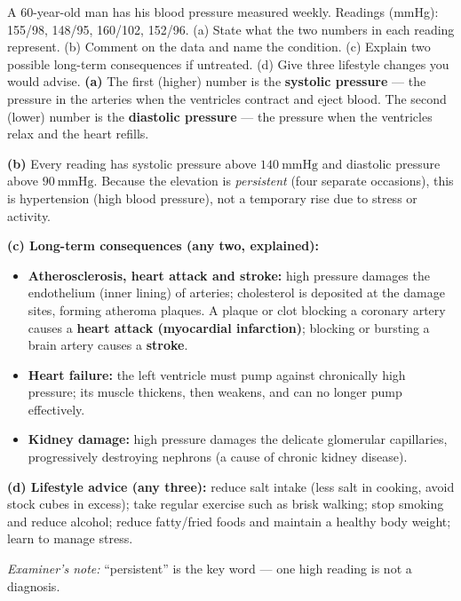 \documentclass[11pt]{article}
\newcommand{\cle}[1]{{\popxbold\color{popdark}#1}}
\begin{document}
\begin{exoresolu}
A 60-year-old man has his blood pressure measured weekly. Readings (mmHg): 155/98, 148/95, 160/102, 152/96. (a) State what the two numbers in each reading represent. (b) Comment on the data and name the condition. (c) Explain two possible long-term consequences if untreated. (d) Give three lifestyle changes you would advise.
\tcblower
\textbf{(a)} The first (higher) number is the \textbf{systolic pressure} — the pressure in the arteries when the ventricles contract and eject blood. The second (lower) number is the \textbf{diastolic pressure} — the pressure when the ventricles relax and the heart refills.

\textbf{(b)} Every reading has systolic pressure above $140\ \mathrm{mmHg}$ and diastolic pressure above $90\ \mathrm{mmHg}$. Because the elevation is \emph{persistent} (four separate occasions), this is \cle{hypertension} (high blood pressure), not a temporary rise due to stress or activity.

\textbf{(c) Long-term consequences (any two, explained):}
\begin{itemize}
\item \textbf{Atherosclerosis, heart attack and stroke:} high pressure damages the endothelium (inner lining) of arteries; cholesterol is deposited at the damage sites, forming atheroma plaques. A plaque or clot blocking a coronary artery causes a \textbf{heart attack (myocardial infarction)}; blocking or bursting a brain artery causes a \textbf{stroke}.
\item \textbf{Heart failure:} the left ventricle must pump against chronically high pressure; its muscle thickens, then weakens, and can no longer pump effectively.
\item \textbf{Kidney damage:} high pressure damages the delicate glomerular capillaries, progressively destroying nephrons (a cause of chronic kidney disease).
\end{itemize}

\textbf{(d) Lifestyle advice (any three):} reduce salt intake (less salt in cooking, avoid stock cubes in excess); take regular exercise such as brisk walking; stop smoking and reduce alcohol; reduce fatty/fried foods and maintain a healthy body weight; learn to manage stress.

\emph{Examiner's note:} ``persistent'' is the key word — one high reading is not a diagnosis.
\end{exoresolu}
\end{document}

